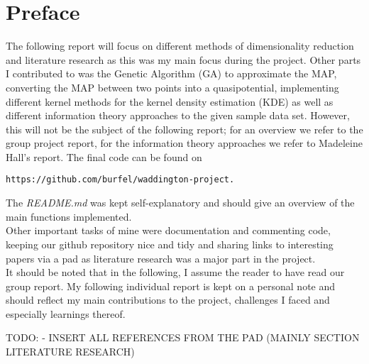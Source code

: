 \documentclass[journal, a4paper]{IEEEtran}
\begin{document}
\section{Preface}
The following report will focus on different methods of dimensionality reduction and literature research as this was my main focus during the project. 
Other parts I contributed to was the Genetic Algorithm (GA) to approximate the MAP, converting the MAP between two points into a quasipotential, implementing different kernel methods for the kernel density estimation (KDE) as well as different information theory approaches to the given sample data set. However, this will not be the subject of the following report; for an overview we refer to the group project report, for the information theory approaches we refer to Madeleine Hall's report. The final code can be found on \begin{verbatim}
https://github.com/burfel/waddington-project.
\end{verbatim}	
The \textit{README.md} was kept self-explanatory and should give an overview of the main functions implemented. \\
Other important tasks of mine were documentation and commenting code, keeping our github repository nice and tidy and sharing links to interesting papers via a pad as literature research was a major part in the project. \\

It should be noted that in the following, I assume the reader to have read our group report. My following individual report is kept on a personal note and should reflect my main contributions to the project, challenges I faced and especially learnings thereof. 


TODO:
- INSERT ALL REFERENCES FROM THE PAD (MAINLY SECTION LITERATURE RESEARCH)
	

\end{document}
